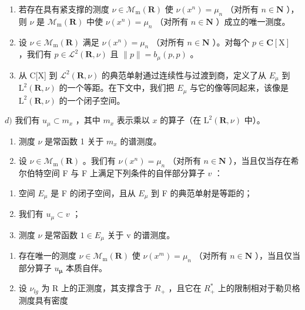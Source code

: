 \begin{enumerate}
\def\labelenumi{\alph{enumi})}
\item
  若存在具有紧支撑的测度 \(\nu \in \mathcal{M}_{\mathrm{m}}(\mathbf{R})\) 使 \(\nu(x^{n}) = \mu_{n}\) （对所有 \(n \in \mathbf{N}\) ），则 \(\nu\) 是 \(\mathcal{M}_{\mathrm{m}}(\mathbf{R})\) 中使 \(\nu(x^{n}) = \mu_{n}\) （对所有 \(n \in \mathbf{N}\) ）成立的唯一测度。
\item
  设 \(\nu \in \mathcal{M}_{\mathrm{m}}(\mathbf{R})\) 满足 \(\nu (x^n) = \mu_n\) （对所有 \(n\in \mathbf{N}\) ）。对每个 \(p\in \mathbf{C}[\mathrm{X}]\) ，我们有 \(p\in \mathcal{L}^2 (\mathbf{R},\nu)\) 且 \(\| p\| = b_{\mu}(p,p)\) 。
\item
  从 C{[}X{]} 到 \(\mathcal{L}^{2}(\mathbf{R},\nu)\) 的典范单射通过连续性与过渡到商，定义了从 \(E_{\mu}\) 到 \(\mathrm{L}^{2}(\mathbf{R},\nu)\) 的一个等距。在下文中，我们把 \(E_{\mu}\) 与它的像等同起来，该像是 \(\mathrm{L}^{2}(\mathbf{R},\nu)\) 的一个闭子空间。
\end{enumerate}

\(d)\) 我们有 \(u_{\mu} \subset m_x\) ，其中 \(m_x\) 表示乘以 \(x\) 的算子（在 \(\mathrm{L}^2(\mathbf{R}, \nu)\) 中）。

\begin{enumerate}
\def\labelenumi{\alph{enumi})}
\setcounter{enumi}{4}
\item
  测度 \(\nu\) 是常函数 1 关于 \(m_x\) 的谱测度。
\item
  设 \(\nu \in \mathcal{M}_{\mathrm{m}}(\mathbf{R})\) 。我们有 \(\nu(x^n) = \mu_n\) （对所有 \(n \in \mathbf{N}\) ），当且仅当存在希尔伯特空间 F 与 F 上满足下列条件的自伴部分算子 \(v\) ：
\end{enumerate}

\begin{enumerate}
\def\labelenumi{(\roman{enumi})}
\item
  空间 \(E_{\mu}\) 是 F 的闭子空间，且从 \(E_{\mu}\) 到 F 的典范单射是等距的；
\item
  我们有 \(u_{\mu} \subset v\) ；
\item
  测度 \(\nu\) 是常函数 \(1 \in E_{\mu}\) 关于 v 的谱测度。
\end{enumerate}

\begin{enumerate}
\def\labelenumi{\alph{enumi})}
\setcounter{enumi}{6}
\item
  存在唯一的测度 \(\nu \in \mathcal{M}_{\mathrm{m}}(\mathbf{R})\) 使 \(\nu(x^{m}) = \mu_{n}\) （对所有 \(n \in \mathbf{N}\) ），当且仅当部分算子 \(u_{\boldsymbol{\mu}}\) 本质自伴。
\item
  设 \(\nu_{lg}\) 为 R 上的正测度，其支撑含于 \(R_{+}\) ，且它在 \(R_{+}^{*}\) 上的限制相对于勒贝格测度具有密度
\end{enumerate}

